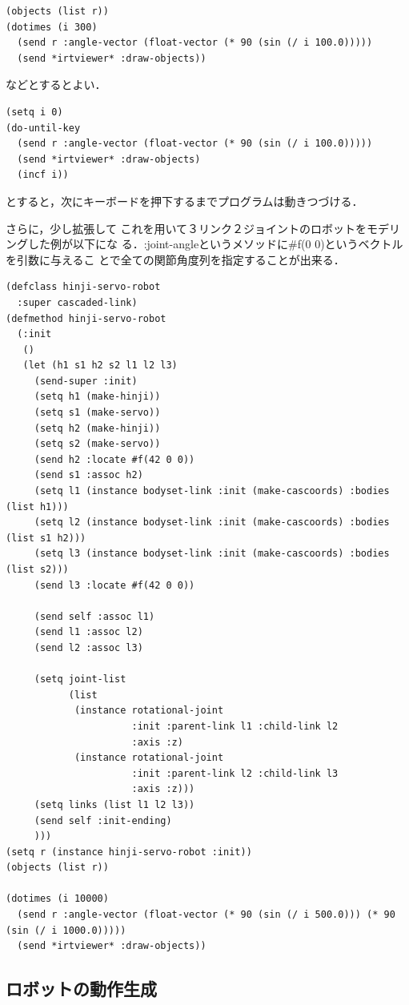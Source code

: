 {\baselineskip=10pt
\begin{verbatim}
(objects (list r))
(dotimes (i 300)
  (send r :angle-vector (float-vector (* 90 (sin (/ i 100.0)))))
  (send *irtviewer* :draw-objects))
\end{verbatim}
}

などとするとよい．

{\baselineskip=10pt
\begin{verbatim}
(setq i 0)
(do-until-key
  (send r :angle-vector (float-vector (* 90 (sin (/ i 100.0)))))
  (send *irtviewer* :draw-objects)
  (incf i))
\end{verbatim}
}
とすると，次にキーボードを押下するまでプログラムは動きつづける．

さらに，少し拡張して
これを用いて３リンク２ジョイントのロボットをモデリングした例が以下にな
る．:joint-angleというメソッドに\#f(0 0)というベクトルを引数に与えるこ
とで全ての関節角度列を指定することが出来る．

{\baselineskip=10pt
\begin{verbatim}
(defclass hinji-servo-robot
  :super cascaded-link)
(defmethod hinji-servo-robot
  (:init
   ()
   (let (h1 s1 h2 s2 l1 l2 l3)
     (send-super :init)
     (setq h1 (make-hinji))
     (setq s1 (make-servo))
     (setq h2 (make-hinji))
     (setq s2 (make-servo))
     (send h2 :locate #f(42 0 0))
     (send s1 :assoc h2)
     (setq l1 (instance bodyset-link :init (make-cascoords) :bodies (list h1)))
     (setq l2 (instance bodyset-link :init (make-cascoords) :bodies (list s1 h2)))
     (setq l3 (instance bodyset-link :init (make-cascoords) :bodies (list s2)))
     (send l3 :locate #f(42 0 0))

     (send self :assoc l1)
     (send l1 :assoc l2)
     (send l2 :assoc l3)

     (setq joint-list
           (list
            (instance rotational-joint
                      :init :parent-link l1 :child-link l2
                      :axis :z)
            (instance rotational-joint
                      :init :parent-link l2 :child-link l3
                      :axis :z)))
     (setq links (list l1 l2 l3))
     (send self :init-ending)
     )))
(setq r (instance hinji-servo-robot :init))
(objects (list r))

(dotimes (i 10000)
  (send r :angle-vector (float-vector (* 90 (sin (/ i 500.0))) (* 90 (sin (/ i 1000.0)))))
  (send *irtviewer* :draw-objects))
\end{verbatim}
}

\subsection{ロボットの動作生成}

